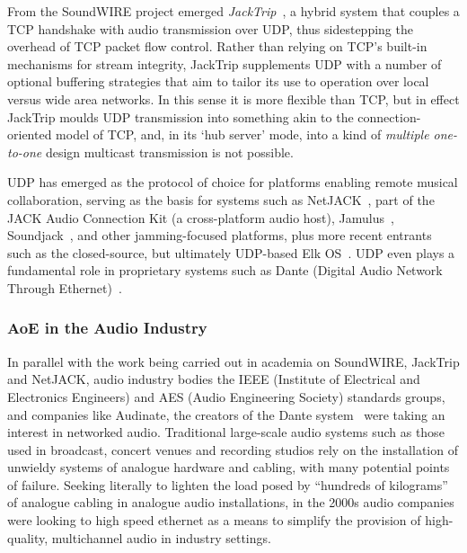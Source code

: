 From the SoundWIRE project emerged
\textit{JackTrip}~\citep{caceres_jacktrip_2010,caceras_jacktripsoundwire_2010},
a hybrid system that couples a TCP handshake with audio transmission over UDP,
thus sidestepping the overhead of TCP packet flow control.
Rather than relying on TCP's built-in mechanisms for stream integrity, JackTrip
supplements UDP with a number of optional buffering strategies that aim to
tailor its use to operation over local versus wide area networks.
In this sense it is more flexible than TCP, but in effect JackTrip moulds UDP
transmission into something akin to the connection-oriented model of TCP, and,
in its `hub server' mode, into a kind of \textit{multiple one-to-one} design
\textemdash{} multicast transmission is not possible.

UDP has emerged as the protocol of choice for platforms enabling remote musical
collaboration, serving as the basis for systems such as
NetJACK~\citep{carot_netjack_2009}, part of the JACK Audio Connection Kit (a
cross-platform audio host), Jamulus~\citep{fischer_case_2015},
Soundjack~\citep{renaud_networked_2012}, and other jamming-focused platforms,
plus more recent entrants such as the closed-source, but ultimately UDP-based
Elk OS~\citep{turchet_elk_2021}.
UDP even plays a fundamental role in proprietary systems such as Dante (Digital
Audio Network Through Ethernet)~\citep{dante_what_2022}.

\subsubsection{AoE in the Audio Industry}

In parallel with the work being carried out in academia on SoundWIRE, JackTrip
and NetJACK, audio industry bodies \textemdash{} the IEEE (Institute of
Electrical and Electronics Engineers) and AES (Audio Engineering Society)
standards groups, and companies like Audinate, the creators of the Dante system\
\textemdash{} were taking an interest in networked audio.
Traditional large-scale audio systems such as those used in broadcast, concert
venues and recording studios rely on the installation of unwieldy systems of
analogue hardware and cabling, with many potential points of failure.
Seeking literally to lighten the load posed by ``hundreds of
kilograms''~\citep{bakker_introduction_2014} of analogue cabling in analogue
audio installations, in the 2000s audio companies were looking to high speed
ethernet as a means to simplify the provision of high-quality, multichannel
audio in industry settings.

